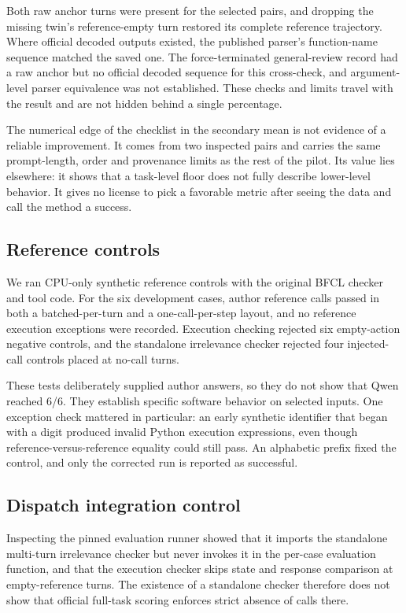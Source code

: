 \documentclass[conference]{IEEEtran}
\begin{document}
Both raw anchor turns were present for the selected pairs, and dropping the missing twin's reference-empty turn restored its complete reference trajectory. Where official decoded outputs existed, the published parser's function-name sequence matched the saved one. The force-terminated general-review record had a raw anchor but no official decoded sequence for this cross-check, and argument-level parser equivalence was not established. These checks and limits travel with the result and are not hidden behind a single percentage.

The numerical edge of the checklist in the secondary mean is not evidence of a reliable improvement. It comes from two inspected pairs and carries the same prompt-length, order and provenance limits as the rest of the pilot. Its value lies elsewhere: it shows that a task-level floor does not fully describe lower-level behavior. It gives no license to pick a favorable metric after seeing the data and call the method a success.

\subsection{Reference controls}
We ran CPU-only synthetic reference controls with the original BFCL checker and tool code. For the six development cases, author reference calls passed in both a batched-per-turn and a one-call-per-step layout, and no reference execution exceptions were recorded. Execution checking rejected six empty-action negative controls, and the standalone irrelevance checker rejected four injected-call controls placed at no-call turns.

These tests deliberately supplied author answers, so they do not show that Qwen reached 6/6. They establish specific software behavior on selected inputs. One exception check mattered in particular: an early synthetic identifier that began with a digit produced invalid Python execution expressions, even though reference-versus-reference equality could still pass. An alphabetic prefix fixed the control, and only the corrected run is reported as successful.

\subsection{Dispatch integration control}
Inspecting the pinned evaluation runner showed that it imports the standalone multi-turn irrelevance checker but never invokes it in the per-case evaluation function, and that the execution checker skips state and response comparison at empty-reference turns. The existence of a standalone checker therefore does not show that official full-task scoring enforces strict absence of calls there.
\end{document}
